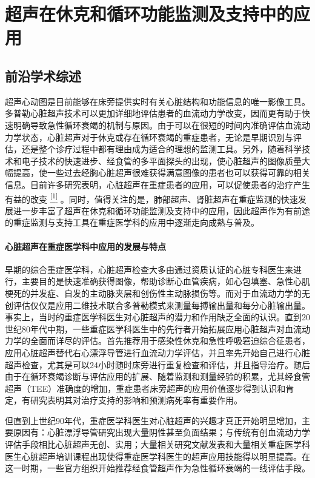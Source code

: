 \chapter{超声在休克和循环功能监测及支持中的应用}

\section{前沿学术综述}

超声心动图是目前能够在床旁提供实时有关心脏结构和功能信息的唯一影像工具。多普勒心脏超声技术可以更加详细地评估患者的血流动力学改变，因而更有助于快速明确导致急性循环衰竭的机制与原因。由于可以在很短的时间内准确评估血流动力学状态，心脏超声对于休克或存在循环衰竭的重症患者，无论是早期识别与评估，还是整个诊疗过程中都有理由成为适合的理想的监测工具。另外，随着科学技术和电子技术的快速进步、经食管的多平面探头的出现，使心脏超声的图像质量大幅提高，使一些过去经胸心脏超声很难获得满意图像的患者也可以获得可靠的相关信息。目前许多研究表明，心脏超声在重症患者的应用，可以促使患者的治疗产生有益的改变
\protect\hyperlink{text00009.htmlux5cux23ch1-8}{\textsuperscript{{[}1{]}}}
。同时，值得关注的是，肺部超声、肾脏超声在重症监测的快速发展进一步丰富了超声在休克和循环功能监测及支持中的应用，因此超声作为有前途的重症监测与支持工具在重症医学科的应用中逐渐走向成熟与普及。

\subsubsection{心脏超声在重症医学科中应用的发展与特点}

早期的综合重症医学科，心脏超声检查大多由通过资质认证的心脏专科医生来进行，主要目的是快速准确获得图像，帮助诊断心血管疾病，如心包填塞、急性心肌梗死的并发症、自发的主动脉夹层和创伤性主动脉损伤等。而对于血流动力学的无创评估仅仅是应用二维技术联合多普勒模式来测量每搏输出量和每分心脏输出量。事实上，当时的重症医学科医生对心脏超声的潜力和作用缺乏全面的认识。直到20世纪80年代中期，一些重症医学科医生中的先行者开始拓展应用心脏超声对血流动力学的全面而详尽的评估。首先推荐用于感染性休克和急性呼吸窘迫综合征患者，应用心脏超声替代右心漂浮导管进行血流动力学评估，并且率先开始自己进行心脏超声检查，尤其是可以24小时随时床旁进行重复检查和评估，并且指导治疗。随后由于在循环衰竭诊断与评估应用的扩展、随着监测和测量经验的积累，尤其经食管超声（TEE）准确度的增加，重症患者床旁超声的应用价值逐步得到认识和肯定，有研究表明其对治疗支持的影响和预测病死率有重要作用。

但直到上世纪90年代，重症医学科医生对心脏超声的兴趣才真正开始明显增加，主要原因有：心脏漂浮导管研究出现大量阴性甚至负面结果；与传统有创血流动力学评估手段相比心脏超声无创、实用；大量相关研究文献发表和大量相关重症医学科医生心脏超声培训课程出现使得重症医学科医生的超声应用技能得以明显提高。在这一时期，一些官方组织开始推荐经食管超声作为急性循环衰竭的一线评估手段。

